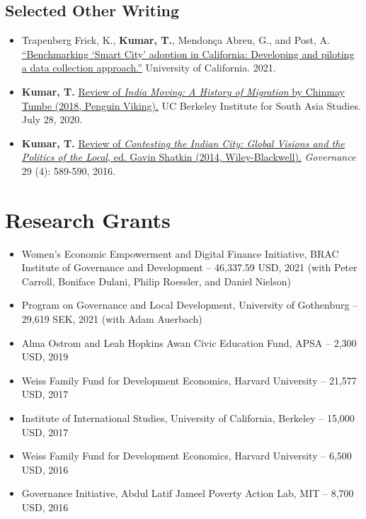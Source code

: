 \documentclass[11pt]{article}
\begin{document}
\subsection*{Selected Other Writing}	
\begin{itemize}
\item[]Trapenberg Frick, K., \textbf{Kumar, T.}, Mendon\c{c}a Abreu, G., and Post, A. \href{https://escholarship.org/uc/item/3797p0ws}{``Benchmarking `Smart City' adoption in California: Developing and piloting a data collection approach.''} University of California. 2021. 



\item[]\textbf{Kumar, T.} \href{https://southasia.berkeley.edu/sites/default/files/shared/India_Center/India_Moving.pdf}{Review of \textit{India Moving: A History of Migration} by Chinmay Tumbe (2018, Penguin Viking).}  UC Berkeley Institute for South Asia Studies. July 28, 2020.

\item[]\textbf{Kumar, T.} \href{http://onlinelibrary.wiley.com/doi/10.1111/gove.12241/abstract}{Review of \textit{Contesting the Indian City: Global Visions and the Politics of the Local}, ed. Gavin Shatkin (2014, Wiley-Blackwell).} \textit{Governance} 29 (4): 589-590, 2016. 



\end{itemize}


\vspace{2mm}
\color{MidnightBlue}

\section*{Research Grants}
\color{Black}
\begin{itemize}
\item[]Women's Economic Empowerment and Digital Finance Initiative, BRAC Institute of Governance and Development -- 46,337.59 USD, 2021 (with Peter Carroll, Boniface Dulani, Philip Roessler, and Daniel Nielson)

\item[] Program on Governance and Local Development, University of Gothenburg -- 29,619 SEK, 2021 (with Adam Auerbach)
\item[] Alma Ostrom and Leah Hopkins Awan Civic Education Fund, APSA -- 2,300 USD, 2019

\item[] Weiss Family Fund for Development Economics, Harvard University -- 21,577 USD, 2017


	 
\item[]Institute of International Studies, University of California, Berkeley -- 15,000 USD, 2017
\item[] Weiss Family Fund for Development Economics, Harvard University -- 6,500 USD, 2016 

\item[] Governance Initiative, Abdul Latif Jameel Poverty Action Lab, MIT -- 8,700 USD, 2016	
\end{itemize}
\end{document}
